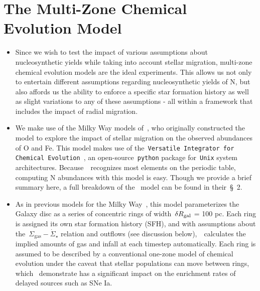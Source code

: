 \documentclass[ms.tex]{subfiles}
\begin{document}
 

\section{The Multi-Zone Chemical Evolution Model} 
\label{sec:methods} 

\par\null\par

\begin{itemize} 
	\item Since we wish to test the impact of various assumptions about 
	nucleosynthetic yields while taking into account stellar migration, 
	multi-zone chemical evolution models are the ideal experiments. 
	This allows us not only to entertain different assumptions regarding 
	nucleosynthetic yields of N, but also affords us the ability to enforce a 
	specific star formation history as well as slight variations to any of 
	these assumptions - all within a framework that includes the impact of 
	radial migration. 

	\item We make use of the Milky Way models of~\citet{Johnson2021}, who 
	originally constructed the model to explore the impact of stellar migration 
	on the observed abundances of O and Fe. 
	This model makes use of the~\texttt{Versatile Integrator for Chemical 
	Evolution}~\citep[\vice;][]{Johnson2020, Griffith2021, Johnson2021}, an 
	open-source~\texttt{python} package for~\texttt{Unix} system architectures. 
	Because~\vice~recognizes most elements on the periodic table, computing 
	N abundances with this model is easy. 
	Though we provide a brief summary here, a full breakdown of 
	the~\citet{Johnson2021} model can be found in their~\S~2. 

	\item As in previous models for the Milky Way~\citep[e.g.][]{Matteucci1989, 
	Schoenrich2009, Minchev2013, Minchev2014, Minchev2017, Sharma2020}, this 
	model parameterizes the Galaxy disc as a series of concentric rings of 
	width~$\delta R_\text{gal}$ = 100 pc.
	Each ring is assigned its own star formation history (SFH), and with 
	assumptions about the~$\Sigma_\text{gas}-\dot{\Sigma}_\star$ relation and 
	outflows (see discussion below),~\vice~calculates the implied amounts of 
	gas and infall at each timestep automatically. 
	Each ring is assumed to be described by a conventional one-zone model of 
	chemical evolution under the caveat that stellar populations can move 
	between rings, which~\citet{Johnson2021} demonstrate has a significant 
	impact on the enrichment rates of delayed sources such as SNe Ia. 


\end{itemize}
\end{document}
